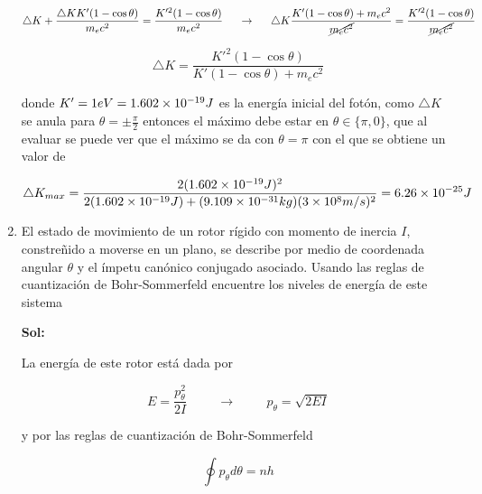 \documentclass[12pt,a4paper]{article}
\begin{document}
\begin{enumerate}
    \begin{equation*}
        \triangle K + \frac{\triangle K K'(1 - \cos{\theta})}{m_e c^2} = \frac{K'^2(1 - \cos{\theta}) }{m_e c^2} \hspace{0.5cm} \rightarrow \hspace{0.5cm}  \triangle K \frac{ K'(1 - \cos{\theta})+m_e c^2}{\cancel{m_e c^2}} = \frac{K'^2(1 - \cos{\theta}) }{\cancel{m_e c^2}}
    \end{equation*}
    
    \begin{equation*}
        \triangle K = \frac{K'^2(1 - \cos{\theta})}{ K'(1 - \cos{\theta})+m_e c^2}
    \end{equation*}
    
    donde $K'=1 eV =\num{1.602 e -19}J$ es la energía inicial del fotón, como $\triangle K$ se anula para $\theta = \pm \frac{\pi}{2}$ entonces el máximo debe estar en $\theta \in \{\pi,0\}$, que al evaluar se puede ver que el máximo se da con $\theta = \pi$ con el que se obtiene un valor de
    
    \begin{equation*}
        \triangle K_{max} = \frac{2(\num{1.602 e -19}J)^2}{2 (\num{1.602 e -19}J)+(\num{9.109 e-31}kg) ( \num{3 e 8} m/s)^2} = \num{6.26 e -25} J
    \end{equation*}
    
    
    
    
    
    
    \item El estado de movimiento de un rotor rígido con momento de inercia $I$, constreñido a moverse en un plano, se describe por medio de coordenada angular $\theta$ y el ímpetu canónico conjugado asociado. Usando las reglas de cuantización de Bohr-Sommerfeld encuentre los niveles de energía de este sistema 
    
    \textbf{Sol:}
    
    La energía de este rotor está dada por
    
    \begin{equation*}
        E = \frac{p_\theta^2}{2I} \hspace{1cm} \rightarrow \hspace{1cm} p_\theta = \sqrt{2EI}
    \end{equation*}
    
    y por las reglas de cuantización de Bohr-Sommerfeld
    
    \begin{equation*}
        \oint p_\theta d \theta = nh
    \end{equation*}
    

\end{enumerate}
\end{document}
